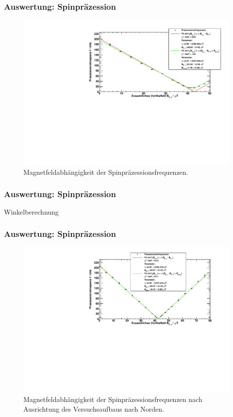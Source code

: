 \begin{frame}
\frametitle{Auswertung: Spinpräzession}

\begin{figure}
    \centering
    \includegraphics[width=\textwidth]{../img/Rb85.pdf}
    \caption{Magnetfeldabhängigkeit der Spinpräzessionsfrequenzen.}  
\end{figure} 
  
\end{frame}


\begin{frame}
\frametitle{Auswertung: Spinpräzession}

Winkelberechnung
  
\end{frame}

\begin{frame}
\frametitle{Auswertung: Spinpräzession}

\begin{figure}
    \centering
    \includegraphics[width=\textwidth]{../img/Rb85_gedreht.pdf}
    \caption{Magnetfeldabhängigkeit der Spinpräzessionsfrequenzen nach Ausrichtung des Versuchsaufbaus nach Norden.}  
\end{figure} 
  
\end{frame}





